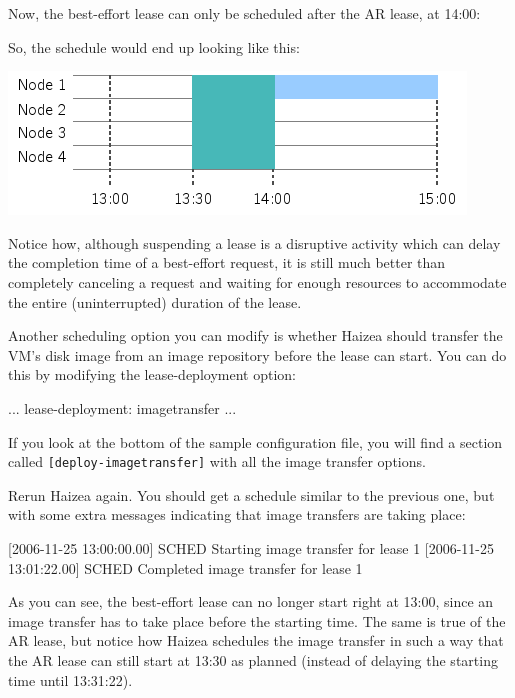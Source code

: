 Now, the best-effort lease can only be scheduled after the AR lease, at 14:00:


So, the schedule would end up looking like this:

\begin{center}
\includegraphics{images/quickstart_leasegraph4.png}
\end{center}

Notice how, although suspending a lease is a disruptive activity which can delay the completion time of a best-effort request, it is still much better than completely canceling a request and waiting for enough resources to accommodate the entire (uninterrupted) duration of the lease.

Another scheduling option you can modify is whether Haizea should transfer the VM's disk image from an image repository before the lease can start. You can do this by modifying the lease-deployment option:

\begin{wideshellverbatim}
[general]
...
lease-deployment: imagetransfer
...
\end{wideshellverbatim}

If you look at the bottom of the sample configuration file, you will find a section called \texttt{[deploy-imagetransfer]} with all the image transfer options.

Rerun Haizea again. You should get a schedule similar to the previous one, but with some extra messages indicating that image transfers are taking place:

[2006-11-25 13:00:00.00] SCHED   Starting image transfer for lease 1
[2006-11-25 13:01:22.00] SCHED   Completed image transfer for lease 1

As you can see, the best-effort lease can no longer start right at 13:00, since an image transfer has to take place before the starting time. The same is true of the AR lease, but notice how Haizea schedules the image transfer in such a way that the AR lease can still start at 13:30 as planned (instead of delaying the starting time until 13:31:22).


